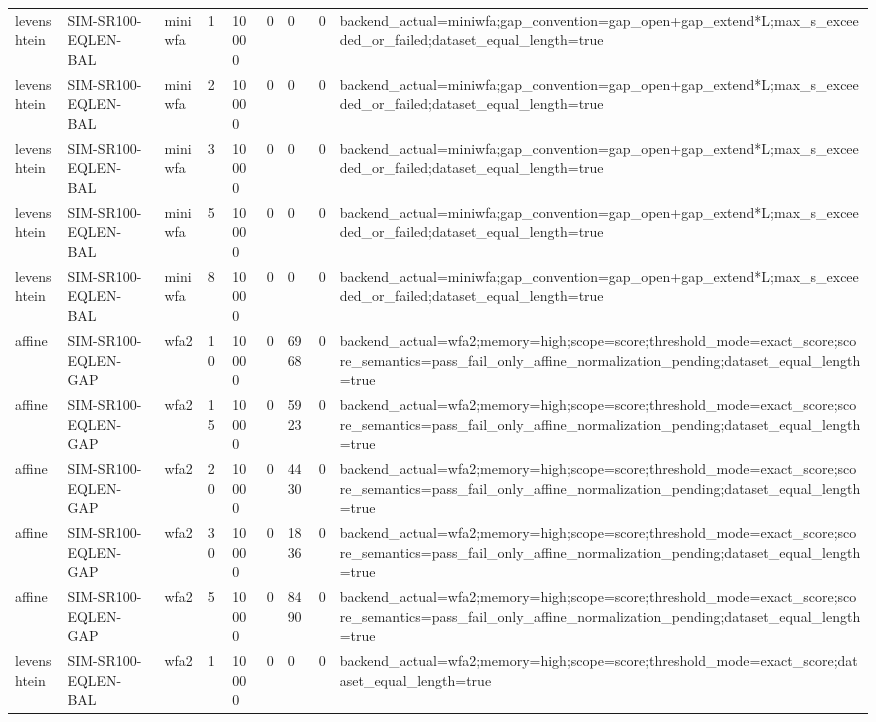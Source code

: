 \begin{tabular}{lllllllll}
levenshtein & SIM-SR100-EQLEN-BAL & miniwfa & 1 & 10000 & 0 & 0 & 0 & backend\_actual=miniwfa;gap\_convention=gap\_open+gap\_extend*L;max\_s\_exceeded\_or\_failed;dataset\_equal\_length=true \\
levenshtein & SIM-SR100-EQLEN-BAL & miniwfa & 2 & 10000 & 0 & 0 & 0 & backend\_actual=miniwfa;gap\_convention=gap\_open+gap\_extend*L;max\_s\_exceeded\_or\_failed;dataset\_equal\_length=true \\
levenshtein & SIM-SR100-EQLEN-BAL & miniwfa & 3 & 10000 & 0 & 0 & 0 & backend\_actual=miniwfa;gap\_convention=gap\_open+gap\_extend*L;max\_s\_exceeded\_or\_failed;dataset\_equal\_length=true \\
levenshtein & SIM-SR100-EQLEN-BAL & miniwfa & 5 & 10000 & 0 & 0 & 0 & backend\_actual=miniwfa;gap\_convention=gap\_open+gap\_extend*L;max\_s\_exceeded\_or\_failed;dataset\_equal\_length=true \\
levenshtein & SIM-SR100-EQLEN-BAL & miniwfa & 8 & 10000 & 0 & 0 & 0 & backend\_actual=miniwfa;gap\_convention=gap\_open+gap\_extend*L;max\_s\_exceeded\_or\_failed;dataset\_equal\_length=true \\
affine & SIM-SR100-EQLEN-GAP & wfa2 & 10 & 10000 & 0 & 6968 & 0 & backend\_actual=wfa2;memory=high;scope=score;threshold\_mode=exact\_score;score\_semantics=pass\_fail\_only\_affine\_normalization\_pending;dataset\_equal\_length=true \\
affine & SIM-SR100-EQLEN-GAP & wfa2 & 15 & 10000 & 0 & 5923 & 0 & backend\_actual=wfa2;memory=high;scope=score;threshold\_mode=exact\_score;score\_semantics=pass\_fail\_only\_affine\_normalization\_pending;dataset\_equal\_length=true \\
affine & SIM-SR100-EQLEN-GAP & wfa2 & 20 & 10000 & 0 & 4430 & 0 & backend\_actual=wfa2;memory=high;scope=score;threshold\_mode=exact\_score;score\_semantics=pass\_fail\_only\_affine\_normalization\_pending;dataset\_equal\_length=true \\
affine & SIM-SR100-EQLEN-GAP & wfa2 & 30 & 10000 & 0 & 1836 & 0 & backend\_actual=wfa2;memory=high;scope=score;threshold\_mode=exact\_score;score\_semantics=pass\_fail\_only\_affine\_normalization\_pending;dataset\_equal\_length=true \\
affine & SIM-SR100-EQLEN-GAP & wfa2 & 5 & 10000 & 0 & 8490 & 0 & backend\_actual=wfa2;memory=high;scope=score;threshold\_mode=exact\_score;score\_semantics=pass\_fail\_only\_affine\_normalization\_pending;dataset\_equal\_length=true \\
levenshtein & SIM-SR100-EQLEN-BAL & wfa2 & 1 & 10000 & 0 & 0 & 0 & backend\_actual=wfa2;memory=high;scope=score;threshold\_mode=exact\_score;dataset\_equal\_length=true \\

\end{tabular}
